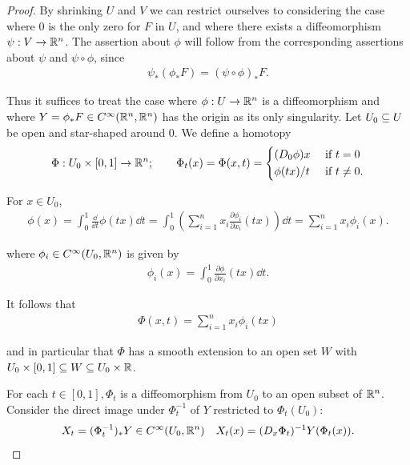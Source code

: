 \begin{proof}
  By shrinking $U$ and $V$ we can restrict ourselves to considering the case
where 0 is the only zero for $F$ in $U$, and where there exists a diffeomorphism
$\psi:V\to{\ensuremath{\mathbb{R}}}^n$. The assertion about $\phi$ will follow from the corresponding assertions
about $\psi$ and $\psi\circ\phi$, since
\begin{align*}
  \psi_*(\phi_*F) = (\psi\circ\phi)_*F.
\end{align*}

Thus it suffices to treat the case where $\phi:U\to {\ensuremath{\mathbb{R}}}^n$ is a diffeomorphism and where
$Y=\phi_* F\in C^\infty({\mathbb{R}}^n, {\mathbb{R}}^n)$ has the origin as its only singularity.
Let $U_0\subseteq U$ be open and star-shaped around 0. We define a homotopy
\begin{align*}
  \Phi:U_0\times [0, 1]\to {\ensuremath{\mathbb{R}}}^n; \qquad \Phi_t(x) 
    = \Phi(x, t) = \left\{\begin{aligned}
      & (D_0\phi)x && \text{ if } t = 0 \\
      & \phi(tx)/t && \text{ if } t\neq 0.
    \end{aligned}\right.
\end{align*}

For $x\in U_0$, 
\begin{align*}
  \phi(x) = \int_0^1 \frac{\dd }{\dd t}\phi(tx)\dd t 
    = \int_0^1 \left( \sum_{i=1}^{n }{x_i\frac{\partial \phi_i }{\partial x_i }(tx)} \right)\dd t
    = \sum_{i=1 }^{n }{x_i\phi_i(x)}.
\end{align*}

where $\phi_i\in C^\infty(U_0, {\mathbb{R}}^n)$ is given by 
\begin{align*}
  \phi_i(x) = \int_0^1 \frac{\partial \phi }{\partial x_i }(tx)\dd t.
\end{align*}

It follows that
\begin{align*}
  \Phi(x, t) = \sum_{i=1 }^{n }{x_i\phi_i (tx)}
\end{align*}

and in particular that $\Phi$ has a smooth extension to an open set $W$ with
$U_0\times[0,1]\subseteq W\subseteq U_0\times{\ensuremath{\mathbb{R}}}$. 

For each $t\in [0,1], \Phi_t$ is a diffeomorphism from $U_0$ to an open subset of ${\mathbb{R}}^n$.
Consider the direct image under $\Phi_t^{-1}$ of $Y$ restricted to $\Phi_t(U_0)$:
\begin{align*}
  X_t = (\Phi_t^{-1})_*Y\in C^\infty(U_0, {\mathbb{R}}^n) && 
  X_t(x) = (D_x\Phi_t)^{-1}Y(\Phi_t(x)).
\end{align*}


\end{proof}
